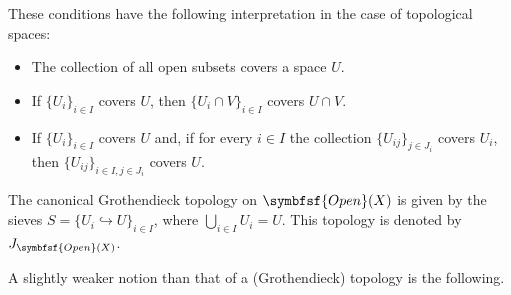     \begin{example}
        These conditions have the following interpretation in the case of topological spaces:
        \begin{itemize}
            \item The collection of all open subsets covers a space $U$.
            \item If $\{U_i\}_{i\in I}$ covers $U$, then $\{U_i\cap V\}_{i\in I}$ covers $U\cap V$.
            \item If $\{U_i\}_{i\in I}$ covers $U$ and, if for every $i\in I$ the collection $\{U_{ij}\}_{j\in J_i}$ covers $U_i$, then $\{U_{ij}\}_{i\in I,j\in J_i}$ covers $U$.
        \end{itemize}
        The canonical Grothendieck topology on $\symbfsf{Open}(X)$ is given by the sieves $S=\{U_i\hookrightarrow U\}_{i\in I}$, where $\bigcup_{i\in I}U_i=U$. This topology is denoted by $J_{\symbfsf{Open}(X)}$.
    \end{example}


    A slightly weaker notion than that of a (Grothendieck) topology is the following.

